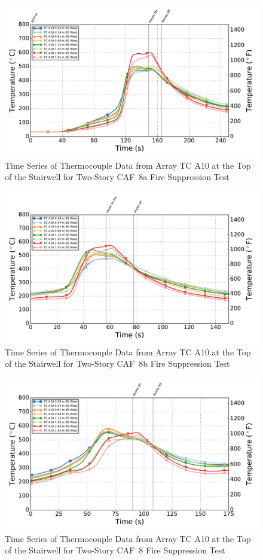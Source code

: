 \documentclass[12pt,oneside]{book}
\begin{document}
\begin{figure}[!ht]
	\includegraphics[width=.85\columnwidth]{../Figures/Script_Figures/Test_40a_West_061415_TC_A10}
	\caption{Time Series of Thermocouple Data from Array TC A10 at the Top of the Stairwell for Two-Story CAF~8a Fire Suppression Test}
	\label{fig:app_caf8a_tca10}
\end{figure}

\begin{figure}[!ht]
	\includegraphics[width=.85\columnwidth]{../Figures/Script_Figures/Test_40b_West_061415_TC_A10}
	\caption{Time Series of Thermocouple Data from Array TC A10 at the Top of the Stairwell for Two-Story CAF~8b Fire Suppression Test}
	\label{fig:app_caf8b_tca10}
\end{figure}

\begin{figure}[!ht]
	\includegraphics[width=.85\columnwidth]{../Figures/Script_Figures/Test_40c_West_061415_TC_A10}
	\caption{Time Series of Thermocouple Data from Array TC A10 at the Top of the Stairwell for Two-Story CAF~8 Fire Suppression Test}
	\label{fig:app_caf8_tca10}
\end{figure}
\end{document}
